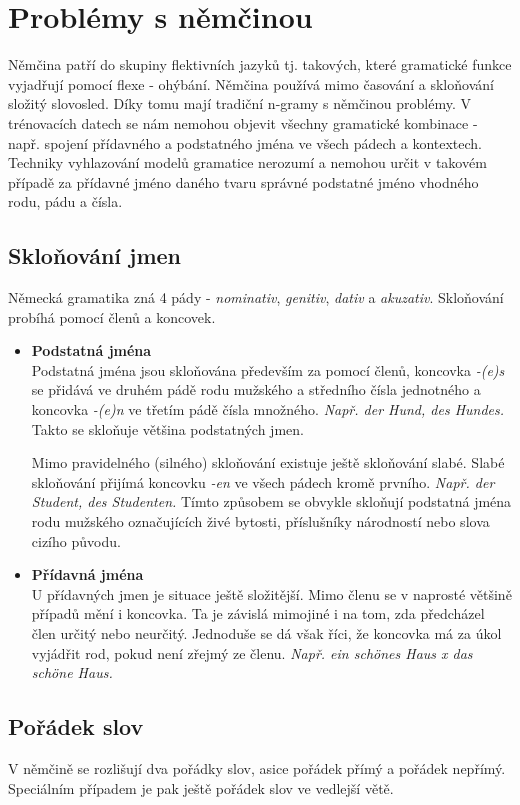 \documentclass[12pt,a4paper]{report}
\begin{document}
\chapter{Problémy s němčinou}
Němčina patří do skupiny flektivních jazyků tj. takových, které gramatické funkce vyjadřují pomocí flexe - ohýbání. Němčina používá mimo časování a skloňování složitý slovosled. Díky tomu mají tradiční n-gramy s němčinou problémy. V trénovacích datech se nám nemohou objevit všechny gramatické kombinace - např. spojení přídavného a podstatného jména ve všech pádech a kontextech. Techniky vyhlazování modelů gramatice nerozumí a nemohou určit v takovém případě za přídavné jméno daného tvaru správné podstatné jméno vhodného rodu, pádu a čísla.

\section{Skloňování jmen}
Německá gramatika zná 4 pády - \textit{nominativ}, \textit{genitiv}, \textit{dativ} a \textit{akuzativ}. Skloňování probíhá pomocí členů a koncovek. 
\begin{itemize}
\item
\textbf{Podstatná jména}\\
Podstatná jména jsou skloňována především za pomocí členů, koncovka \textit{-(e)s} se přidává ve druhém pádě rodu mužského a středního čísla jednotného a koncovka \textit{-(e)n} ve třetím pádě čísla množného. \textit{Např. der Hund, des Hundes.} Takto se skloňuje většina podstatných jmen.

Mimo pravidelného (silného) skloňování existuje ještě skloňování slabé. Slabé skloňování přijímá koncovku \textit{-en} ve všech pádech kromě prvního. \textit{Např. der Student, des Studenten.} Tímto způsobem se obvykle skloňují podstatná jména rodu mužského označujících živé bytosti, příslušníky národností nebo slova cizího původu.

\item
\textbf{Přídavná jména}\\
U přídavných jmen je situace ještě složitější. Mimo členu se v naprosté většině případů mění i koncovka. Ta je závislá mimojiné i na tom, zda předcházel člen určitý nebo neurčitý. Jednoduše se dá však říci, že koncovka má za úkol vyjádřit rod, pokud není zřejmý ze členu. \textit{Např. ein schönes Haus x das schöne Haus.}
\end{itemize}

\section{Pořádek slov}
V němčině se rozlišují dva pořádky slov, asice pořádek přímý a pořádek nepřímý. Speciálním případem je pak ještě pořádek slov ve vedlejší větě.
\end{document}
